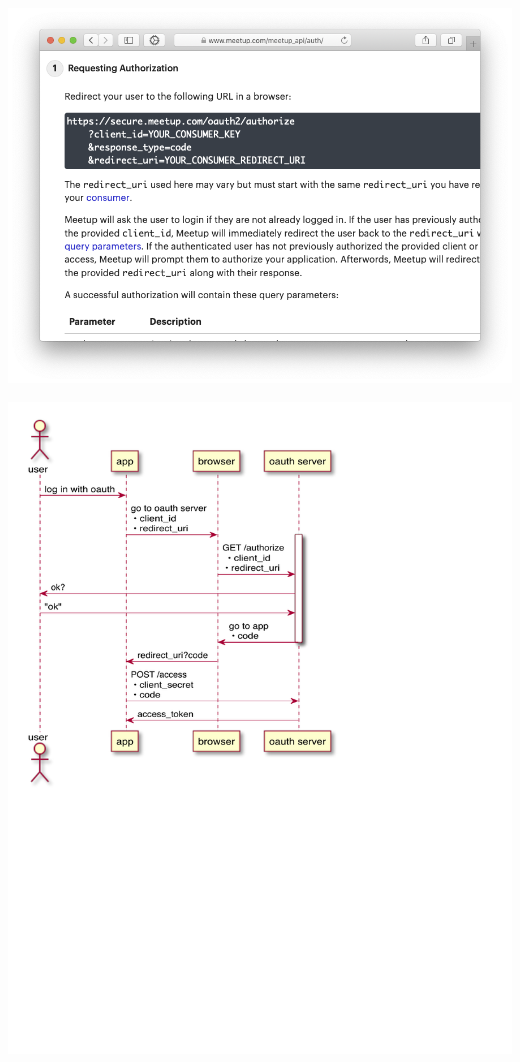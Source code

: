 \documentclass[xcolor=svgnames,17pt]{beamer}
\begin{document}
\begin{frame}[plain]
\includegraphics[width=0.9\paperwidth,center]{how-oauth-works.png}
\end{frame}

\begin{frame}[plain]
\includegraphics[width=0.7\paperwidth,center]{uml-flow1.pdf}
\end{frame}
\end{document}
